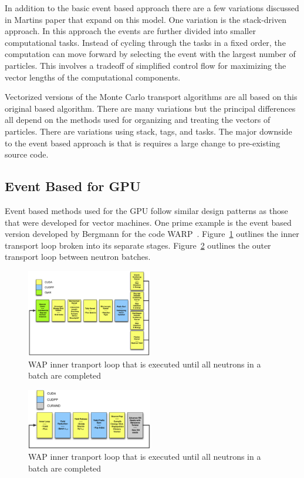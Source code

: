 In addition to the basic event based approach there are a few variations discussed in Martins paper that expand on this model.
%
One variation is the stack-driven approach.
%
In this approach the events are further divided into smaller computational tasks.
%
Instead of cycling through the tasks in a fixed order, the computation can move forward by selecting the event with the largest number of particles.
%
This involves a tradeoff of simplified control flow for maximizing the vector lengths of the computational components.
%

%
Vectorized versions of the Monte Carlo transport algorithms are all based on this original based algorithm.
%
There are many variations but the principal differences all depend on the methods used for organizing and treating the vectors of particles.
%
There are variations using stack, tags, and tasks.
%
The major downside to the event based approach is that is requires a large change to pre-existing source code.
%

\subsection*{\textbf{Event Based for GPU}}

%
Event based methods used for the GPU follow similar design patterns as those that were developed for vector machines.
%
One prime example is the event based version developed by Bergmann for the code WARP~\cite{2014development}.
%
Figure~\ref{fig:innerLoopWARP} outlines the inner transport loop broken into its separate stages.
%
Figure~\ref{fig:outerLoopWARP} outlines the outer transport loop between neutron batches.
%

\begin{figure}
\includegraphics[width=0.49\textwidth]{InnerLoopWARP}
\caption{WAP inner tranport loop that is executed until all neutrons in a batch are completed~\cite{2014development}}
\label{fig:innerLoopWARP}
\end{figure}

\begin{figure}
\includegraphics[width=0.49\textwidth]{OuterLoopWARP}
\caption{WAP inner tranport loop that is executed until all neutrons in a batch are completed~\cite{2014development}}
\label{fig:outerLoopWARP}
\end{figure}

